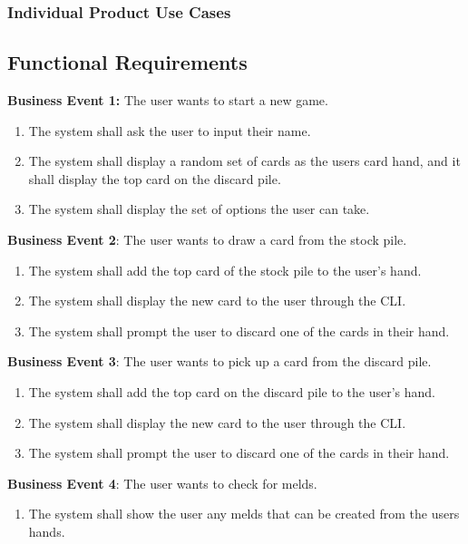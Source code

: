 \documentclass[12pt, titlepage]{article}
\begin{document}
\subsubsection{Individual Product Use Cases}

\subsection{Functional Requirements}
\textbf{Business Event 1:} The user wants to start a new game.
\begin{enumerate}
    \item The system shall ask the user to input their name.
    \item The system shall display a random set of cards as the users card hand, and it shall display the top card on the discard pile.
    \item The system shall display the set of options the user can take.
\end{enumerate}

\textbf{Business Event 2}: The user wants to draw a card from the stock pile.
\begin{enumerate}
    \item The system shall add the top card of the stock pile to the user's hand.
    \item The system shall display the new card to the user through the CLI.
    \item The system shall prompt the user to discard one of the cards in their hand.
\end{enumerate}

\textbf{Business Event 3}: The user wants to pick up a card from the discard pile.
\begin{enumerate}
    \item The system shall add the top card on the discard pile to the user's hand.
    \item The system shall display the new card to the user through the CLI.
    \item The system shall prompt the user to discard one of the cards in their hand.
\end{enumerate}

\textbf{Business Event 4}: The user wants to check for melds. 
\begin{enumerate}
    \item The system shall show the user any melds that can be created from the users hands.
\end{enumerate}
\end{document}
